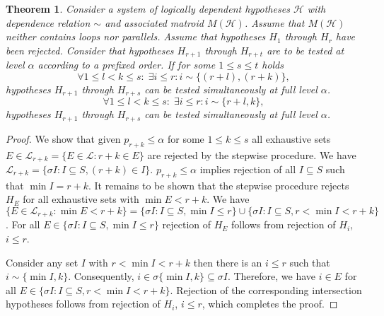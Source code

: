\documentclass[a4paper,12pt]{article}
\newtheorem{theorem}{Theorem}
\begin{document}
\begin{theorem}
  Consider a system of logically dependent hypotheses $\mathscr{H}$
  with dependence relation $\sim$ and associated matroid
  $M(\mathscr{H})$.   Assume that $M(\mathscr{H})$ neither contains loops nor
  parallels. Assume that hypotheses $H_1$ through $H_r$ have been
  rejected. Consider that hypotheses $H_{r+1}$ through $H_{r+t}$ are to
  be tested at level $\alpha$ according to a prefixed order.
  If for some $1 \leq s \leq t$ holds
  \begin{equation}
    \label{eq:cond.hierarchical}
    \forall 1 \leq l < k \leq s: \; \exists i \leq r: i \sim \{(r+l),(r+k)\},
  \end{equation}
  hypotheses $H_{r+1}$ through $H_{r+s}$ can be tested simultaneously
  at full level $\alpha$.
  \begin{equation}
    \label{eq:cond.hierarchical}
    \forall 1 \leq l < k \leq s: \; \exists i \leq r: i \sim \{r+l,k\},
  \end{equation}
  hypotheses $H_{r+1}$ through $H_{r+s}$ can be tested simultaneously
  at full level $\alpha$.
\end{theorem}

\begin{proof}
  We show that given $p_{r+k} \leq \alpha$ for some $1 \leq k \leq s$
  all exhaustive sets $E \in \mathscr{L}_{r+k} = \{E \in \mathscr{L}:
  r+k \in E\}$ are rejected by the stepwise procedure. We have
  $\mathscr{L}_{r+k} = \{\sigma I:I \subseteq S, (r+k) \in
  I\}$. $p_{r+k} \leq \alpha$ implies rejection of all $I \subseteq S$ such that
  $\min I = r+k$. It remains to be shown that the stepwise procedure
  rejects $H_E$ for all exhaustive sets with $\min E < r+k$. We have 
  $\{E \in \mathscr{L}_{r+k}: \min E < r+k\} = \{\sigma I: I \subseteq
  S, \min I \leq r\} \cup \{\sigma I: I \subseteq S, r < \min I <
  r+k\}$. For all $E \in \{\sigma I: I \subseteq
  S, \min I \leq r\}$ rejection of $H_E$ follows from rejection of
  $H_i$, $i \leq r$. 

  Consider any set $I$ with $r < \min I < r+k$ then there is an $i
  \leq r$ such that $i \sim \{\min I,k\}$. Consequently, $i \in \sigma
  \{\min I,k\} \subseteq \sigma I$. Therefore, we have $i \in E$ for
  all $E \in \{\sigma I: I \subseteq S, r < \min I < r+k\}$. Rejection
  of the corresponding intersection hypotheses follows from rejection
  of $H_i$, $i \leq r$, which completes the proof.
\end{proof}
\end{document}

